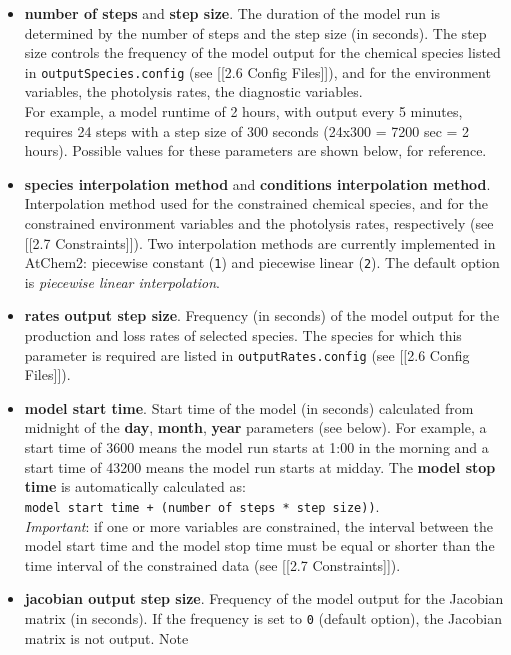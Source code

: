 \begin{itemize}
\item
  \textbf{number of steps} and \textbf{step size}. The duration of the
  model run is determined by the number of steps and the step size (in
  seconds). The step size controls the frequency of the model output for
  the chemical species listed in \texttt{outputSpecies.config} (see
  {[}{[}2.6 Config Files{]}{]}), and for the environment variables, the
  photolysis rates, the diagnostic variables.\\
  For example, a model runtime of 2 hours, with output every 5 minutes,
  requires 24 steps with a step size of 300 seconds (24x300 = 7200 sec =
  2 hours). Possible values for these parameters are shown below, for
  reference.
\item
  \textbf{species interpolation method} and \textbf{conditions
  interpolation method}. Interpolation method used for the constrained
  chemical species, and for the constrained environment variables and
  the photolysis rates, respectively (see {[}{[}2.7 Constraints{]}{]}).
  Two interpolation methods are currently implemented in AtChem2:
  piecewise constant (\texttt{1}) and piecewise linear (\texttt{2}). The
  default option is \emph{piecewise linear interpolation}.
\item
  \textbf{rates output step size}. Frequency (in seconds) of the model
  output for the production and loss rates of selected species. The
  species for which this parameter is required are listed in
  \texttt{outputRates.config} (see {[}{[}2.6 Config Files{]}{]}).
\item
  \textbf{model start time}. Start time of the model (in seconds)
  calculated from midnight of the \textbf{day}, \textbf{month},
  \textbf{year} parameters (see below). For example, a start time of
  3600 means the model run starts at 1:00 in the morning and a start
  time of 43200 means the model run starts at midday. The \textbf{model
  stop time} is automatically calculated as:
  \texttt{model\ start\ time\ +\ (number\ of\ steps\ *\ step\ size))}.\\
  \emph{Important}: if one or more variables are constrained, the
  interval between the model start time and the model stop time must be
  equal or shorter than the time interval of the constrained data (see
  {[}{[}2.7 Constraints{]}{]}).
\item
  \textbf{jacobian output step size}. Frequency of the model output for
  the Jacobian matrix (in seconds). If the frequency is set to
  \texttt{0} (default option), the Jacobian matrix is not output. Note

\end{itemize}
